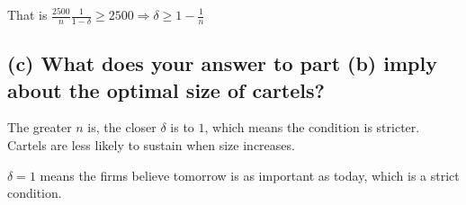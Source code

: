\documentclass{article}
\begin{document}
That is $\frac {2500}{n} \frac{1}{1-\delta} \ge 2500 \Rightarrow \delta \ge 1 -\frac{1}{n}$

\subsection*{(c) What does your answer to part (b) imply about the optimal size of cartels?}

The greater $n$ is, the closer $\delta$ is to $1$, which means the condition is stricter. Cartels are less likely to sustain when size increases.

\begin{mdframed}[backgroundcolor=blue!20,linecolor=white]
$\delta = 1$ means the firms believe tomorrow is as important as today, which is a strict condition.
\end{mdframed}
\end{document}
